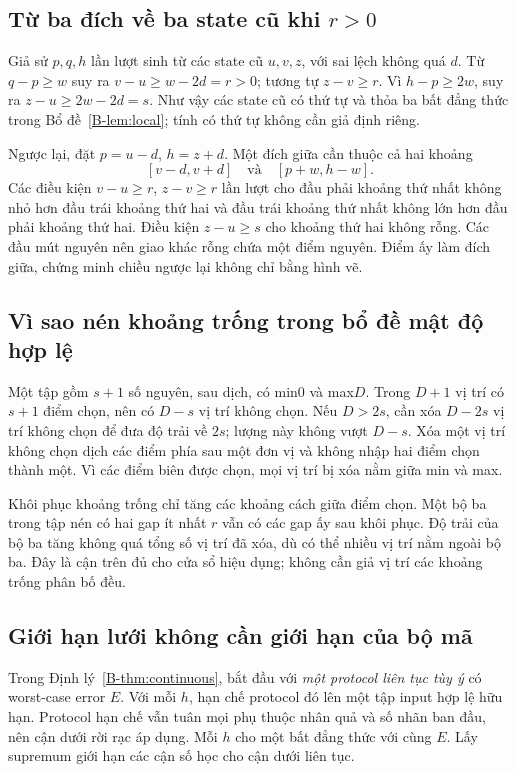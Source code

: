 \subsection{Từ ba đích về ba state cũ khi $r>0$}
Giả sử $p,q,h$ lần lượt sinh từ các state cũ $u,v,z$, với sai lệch không quá $d$. Từ $q-p\ge w$ suy ra $v-u\ge w-2d=r>0$; tương tự $z-v\ge r$. Vì $h-p\ge2w$, suy ra $z-u\ge2w-2d=s$. Như vậy các state cũ có thứ tự và thỏa ba bất đẳng thức trong Bổ đề~\ref{B-lem:local}; tính có thứ tự không cần giả định riêng.

Ngược lại, đặt $p=u-d$, $h=z+d$. Một đích giữa cần thuộc cả hai khoảng
\[
[v-d,v+d]\quad\text{và}\quad[p+w,h-w].
\]
Các điều kiện $v-u\ge r$, $z-v\ge r$ lần lượt cho đầu phải khoảng thứ nhất không nhỏ hơn đầu trái khoảng thứ hai và đầu trái khoảng thứ nhất không lớn hơn đầu phải khoảng thứ hai. Điều kiện $z-u\ge s$ cho khoảng thứ hai không rỗng. Các đầu mút nguyên nên giao khác rỗng chứa một điểm nguyên. Điểm ấy làm đích giữa, chứng minh chiều ngược lại không chỉ bằng hình vẽ.

\subsection{Vì sao nén khoảng trống trong bổ đề mật độ hợp lệ}
Một tập gồm $s+1$ số nguyên, sau dịch, có min0 và max$D$. Trong $D+1$ vị trí có $s+1$ điểm chọn, nên có $D-s$ vị trí không chọn. Nếu $D>2s$, cần xóa $D-2s$ vị trí không chọn để đưa độ trải về $2s$; lượng này không vượt $D-s$. Xóa một vị trí không chọn dịch các điểm phía sau một đơn vị và không nhập hai điểm chọn thành một. Vì các điểm biên được chọn, mọi vị trí bị xóa nằm giữa min và max.

Khôi phục khoảng trống chỉ tăng các khoảng cách giữa điểm chọn. Một bộ ba trong tập nén có hai gap ít nhất $r$ vẫn có các gap ấy sau khôi phục. Độ trải của bộ ba tăng không quá tổng số vị trí đã xóa, dù có thể nhiều vị trí nằm ngoài bộ ba. Đây là cận trên đủ cho cửa sổ hiệu dụng; không cần giả vị trí các khoảng trống phân bố đều.

\subsection{Giới hạn lưới không cần giới hạn của bộ mã}
Trong Định lý~\ref{B-thm:continuous}, bắt đầu với \emph{một protocol liên tục tùy ý} có worst-case error $E$. Với mỗi $h$, hạn chế protocol đó lên một tập input hợp lệ hữu hạn. Protocol hạn chế vẫn tuân mọi phụ thuộc nhân quả và số nhãn ban đầu, nên cận dưới rời rạc áp dụng. Mỗi $h$ cho một bất đẳng thức với cùng $E$. Lấy supremum giới hạn các cận số học cho cận dưới liên tục.

